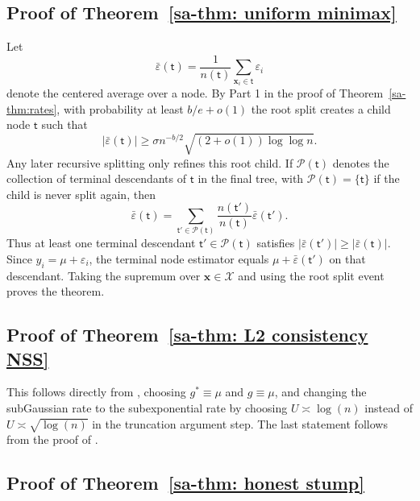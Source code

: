 \documentclass[10pt]{article}
\def\nodet{\mathsf{t}}
\def\bx{\mathbf{x}}
\theoremstyle{definition}
\theoremstyle{remark}
\begin{document}
\subsection{Proof of Theorem~\ref{sa-thm: uniform minimax}}

Let
\[
    \bar\varepsilon(\nodet)
    =
    \frac{1}{n(\nodet)}
    \sum_{\bx_i\in\nodet}\varepsilon_i
\]
denote the centered average over a node. By Part 1 in the proof of Theorem~\ref{sa-thm:rates}, with probability at least $b/e+o(1)$ the root split creates a child node $\nodet$ such that
\[
    |\bar\varepsilon(\nodet)|
    \geq
    \sigma n^{-b/2}\sqrt{(2+o(1))\log\log n}.
\]
Any later recursive splitting only refines this root child. If $\mathcal P(\nodet)$ denotes the collection of terminal descendants of $\nodet$ in the final tree, with $\mathcal P(\nodet)=\{\nodet\}$ if the child is never split again, then
\[
    \bar\varepsilon(\nodet)
    =
    \sum_{\nodet'\in\mathcal P(\nodet)}
    \frac{n(\nodet')}{n(\nodet)}
    \bar\varepsilon(\nodet').
\]
Thus at least one terminal descendant $\nodet'\in\mathcal P(\nodet)$ satisfies $|\bar\varepsilon(\nodet')|\geq|\bar\varepsilon(\nodet)|$. Since $y_i=\mu+\varepsilon_i$, the terminal node estimator equals $\mu+\bar\varepsilon(\nodet')$ on that descendant. Taking the supremum over $\bx\in\mathcal X$ and using the root split event proves the theorem.

\subsection{Proof of Theorem~\ref{sa-thm: L2 consistency NSS}}

This follows directly from \citet[Theorem 4.3]{klusowski2024large}, choosing $g^{\ast} \equiv \mu$ and $g \equiv \mu$, and changing the subGaussian rate to the subexponential rate by choosing $U \asymp \log(n)$ instead of $U \asymp \sqrt{\log(n)}$ in the truncation argument step. The last statement follows from the proof of \citet[Theorem 4.3]{klusowski2024large}.

\subsection{Proof of Theorem~\ref{sa-thm: honest stump}}
\end{document}
